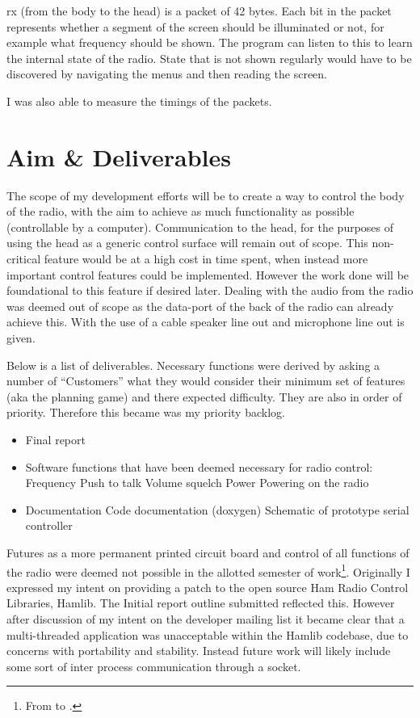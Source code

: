 \gls{rx} (from the body to the head) is a packet of 42 bytes. Each bit in the packet represents whether a segment of the screen should be illuminated or not, for example what frequency should be shown. The program can listen to this to learn the internal state of the radio. State that is not shown regularly would have to be discovered by navigating the menus and then reading the screen.

I was also able to measure the timings of the packets. 

\section{Aim \& Deliverables}
The scope of my development efforts will be to create a way to control the body of the radio, with the aim to achieve as much functionality as possible (controllable by a computer). Communication to the head, for the purposes of using the head as a generic control surface will remain out of scope. This non-critical feature would be at a high cost in time spent, when instead more important control features could be implemented. However the work done will be foundational to this feature if desired later. Dealing with the audio from the radio was deemed out of scope as the data-port of the back of the radio can already achieve this. With the use of a cable speaker line out and microphone line out is given.

Below is a list of deliverables. Necessary functions were derived by asking a number of ``Customers'' what they would consider their minimum set of features (aka the planning game) and there expected difficulty. They are also in order of priority. Therefore this became was my priority backlog.

\begin{itemize}
    \item Final report
    \item Software functions that have been deemed necessary for radio control:
        \subitem Frequency
        \subitem Push to talk
        \subitem Volume
        \subitem \gls{squelch}
        \subitem Power
        \subitem Powering on the radio
    \item Documentation
        \subitem Code documentation (\gls{doxygen})
        \subitem Schematic of prototype serial controller
\end{itemize}

Futures as a more permanent printed circuit board and control of all functions of the radio were deemed not possible in the allotted semester of work\footnote{From  to .}. Originally I expressed my intent on providing a patch to the open source Ham Radio Control Libraries, Hamlib\cite{hamlib}. The Initial report outline submitted reflected this. However after discussion of my intent on the developer mailing list it became clear that a multi-threaded application was unacceptable within the Hamlib codebase, due to concerns with portability and stability. Instead future work will likely include some sort of inter process communication through a socket.

